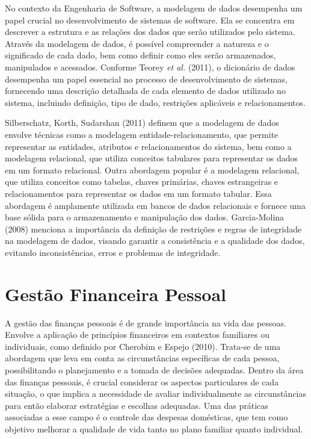 No contexto da Engenharia de Software, a modelagem de dados desempenha um papel crucial no desenvolvimento de sistemas de software. Ela se concentra em descrever a estrutura e as relações dos dados que serão utilizados pelo sistema. Através da modelagem de dados, é possível compreender a natureza e o significado de cada dado, bem como definir como eles serão armazenados, manipulados e acessados.
\nocite{teorey2011database}
Conforme Teorey \textit{et al.} (2011), o dicionário de dados desempenha um papel essencial no processo de desenvolvimento de sistemas, fornecendo uma descrição detalhada de cada elemento de dados utilizado no sistema, incluindo definição, tipo de dado, restrições aplicáveis e relacionamentos.

\nocite{silberschatz2011database}
Silberschatz, Korth, Sudarshan (2011) definem que a modelagem de dados envolve técnicas como a modelagem entidade-relacionamento, que permite representar as entidades, atributos e relacionamentos do sistema, bem como a modelagem relacional, que utiliza conceitos tabulares para representar os dados em um formato relacional.
Outra abordagem popular é a modelagem relacional, que utiliza conceitos como tabelas, chaves primárias, chaves estrangeiras e relacionamentos para representar os dados em um formato tabular. Essa abordagem é amplamente utilizada em bancos de dados relacionais e fornece uma base sólida para o armazenamento e manipulação dos dados.
\nocite{garcia2008database}
Garcia-Molina (2008) menciona a importância da definição de restrições e regras de integridade na modelagem de dados, visando garantir a consistência e a qualidade dos dados, evitando inconsistências, erros e problemas de integridade.

\section{Gestão Financeira Pessoal}
\nocite{baptista2015metodologias}
\nocite{cherobim2010financcas}
A gestão das finanças pessoais é de grande importância na vida das pessoas. Envolve a aplicação de princípios financeiros em contextos familiares ou individuais, como definido por Cherobim e Espejo (2010). Trata-se de uma abordagem que leva em conta as circunstâncias específicas de cada pessoa, possibilitando o planejamento e a tomada de decisões adequadas. Dentro da área das finanças pessoais, é crucial considerar os aspectos particulares de cada situação, o que implica a necessidade de avaliar individualmente as circunstâncias para então elaborar estratégias e escolhas adequadas. Uma das práticas associadas a esse campo é o controle das despesas domésticas, que tem como objetivo melhorar a qualidade de vida tanto no plano familiar quanto individual.

